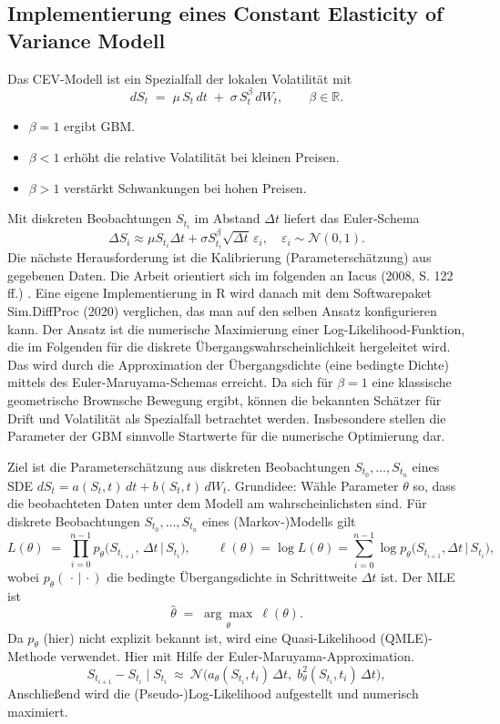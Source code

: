 \subsection{Implementierung eines Constant Elasticity of Variance Modell}
Das CEV-Modell ist ein Spezialfall der lokalen Volatilität mit
$$
dS_t \;=\; \mu\,S_t\,dt \;+\; \sigma\,S_t^{\beta}\,dW_t,\qquad \beta\in\mathbb R.
$$
\begin{itemize}
\item $\beta=1$ ergibt GBM. 
\item $\beta<1$ erhöht die relative Volatilität bei kleinen Preisen.
\item $\beta>1$ verstärkt Schwankungen bei hohen Preisen.
\end{itemize}
Mit diskreten Beobachtungen $S_{t_i}$ im Abstand $\Delta t$ liefert das Euler‑Schema
$$
\Delta S_i \approx \mu S_{t_i}\Delta t + \sigma S_{t_i}^{\beta}\sqrt{\Delta t}\,\varepsilon_i,\quad \varepsilon_i\sim\mathcal N(0,1).
$$
Die nächste Herausforderung ist die Kalibrierung (Parameterschätzung) aus gegebenen Daten. Die Arbeit 
orientiert sich im folgenden an Iacus (2008, S. 122 ff.) \cite{iacus2008}. Eine eigene Implementierung in
R wird danach mit dem Softwarepaket Sim.DiffProc \cite{rsde} (2020) verglichen, das man auf den selben Ansatz konfigurieren kann.
Der Ansatz ist die numerische Maximierung einer Log-Likelihood-Funktion, die im Folgenden 
für die diskrete Übergangswahrscheinlichkeit hergeleitet wird.
Das wird durch die Approximation der Übergangsdichte (eine bedingte Dichte) mittels des 
Euler-Maruyama-Schemas erreicht. Da sich für $\beta=1$ eine klassische geometrische Brownsche Bewegung ergibt, 
können die bekannten Schätzer für Drift und Volatilität als Spezialfall betrachtet werden. Insbesondere stellen die Parameter der GBM 
sinnvolle Startwerte für die numerische Optimierung dar.

\begin{lemma}
Ziel ist die Parameterschätzung aus diskreten Beobachtungen $S_{t_0},\dots,S_{t_n}$ eines SDE
$dS_t=a(S_t,t)\,dt+b(S_t,t)\,dW_t$. Grundidee: Wähle Parameter $\theta$ so, dass die beobachteten 
Daten unter dem Modell am wahrscheinlichsten sind. Für diskrete Beobachtungen $S_{t_0},\dots,S_{t_n}$ eines (Markov‑)Modells gilt
$$
L(\theta) \;=\; \prod_{i=0}^{n-1} p_\theta\!\big(S_{t_{i+1}},\,\Delta t \,\big|\, S_{t_i}\big), 
\qquad
\ell(\theta)=\log L(\theta)=\sum_{i=0}^{n-1}\log p_\theta\!\big(S_{t_{i+1}},\Delta t \,\big|\, S_{t_i}\big),
$$
wobei $p_\theta(\,\cdot\,|\,\cdot)$ die bedingte Übergangsdichte in Schrittweite $\Delta t$ ist. Der MLE ist
$$
\widehat\theta\;=\;\underset{\theta}{\arg\max}\ \ell(\theta).
$$
Da $p_\theta$ (hier) nicht explizit bekannt ist, wird eine Quasi-Likelihood (QMLE)-Methode verwendet. 
Hier mit Hilfe der Euler-Maruyama-Approximation.
$$
S_{t_{i+1}}-S_{t_i}\mid S_{t_i}\ \approx\ \mathcal N\!\big(a_\theta(S_{t_i},t_i)\,\Delta t,\; b_\theta^2(S_{t_i},t_i)\,\Delta t\big),
$$
Anschließend wird die (Pseudo‑)Log‑Likelihood aufgestellt und numerisch maximiert.
\end{lemma}

